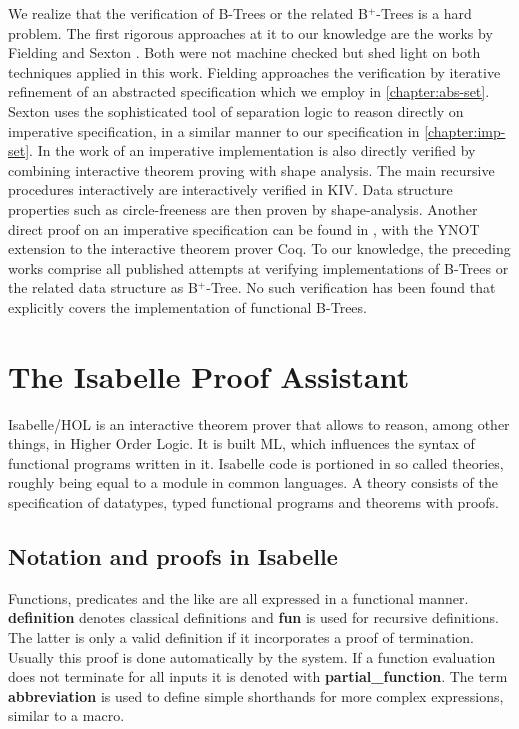 We realize that the verification of B-Trees or the related B$^+$-Trees
is a hard problem.
The first rigorous approaches at it to our knowledge are the works by Fielding \parencite{Fielding80}
and Sexton \parencite{DBLP:journals/entcs/SextonT08}.
Both were not machine checked but shed light on both techniques applied in this work.
Fielding approaches the verification by iterative refinement of an abstracted
specification which we employ in \autoref{chapter:abs-set}.
Sexton uses the sophisticated tool of separation logic to reason directly 
on imperative specification, in a similar manner to our specification in \autoref{chapter:imp-set}.
In the work of\parencite{DBLP:journals/sosym/ErnstSR15}
an imperative implementation is also directly verified
by combining interactive theorem proving 
with shape analysis.
The main recursive procedures interactively are interactively verified in KIV.
Data structure properties such as circle-freeness are then proven by shape-analysis.
Another direct proof on an imperative specification 
can be found in \parencite{DBLP:conf/popl/MalechaMSW10}, with the YNOT
extension to the interactive theorem prover Coq.
To our knowledge, the preceding works comprise
all published attempts at verifying implementations of B-Trees
or the related data structure as B$^+$-Tree.
No such verification has been found that explicitly covers
the implementation of functional B-Trees.


\section{The Isabelle Proof Assistant}

Isabelle/HOL is an interactive theorem prover that allows
to reason, among other things, in Higher Order Logic.\parencite{DBLP:books/sp/NipkowPW02}
It is built ML, which influences the syntax of functional
programs written in it.
Isabelle code is portioned in so called theories,
roughly being equal to a module in common languages.
A theory consists of the specification of datatypes,
typed functional programs and theorems with proofs.

\subsection{Notation and proofs in Isabelle}

Functions, predicates and the like are all expressed in
a functional manner.
\textbf{definition} denotes classical definitions and \textbf{fun}
is used for recursive definitions.
The latter is only a valid definition if it incorporates a proof of termination.
Usually this proof is done automatically by the system.
If a function evaluation does not terminate for all inputs
it is denoted with \textbf{partial\_function}.
The term \textbf{abbreviation} is used to define simple shorthands for more complex expressions,
similar to a macro.

